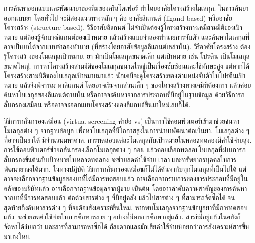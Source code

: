 {\begin{shaded}
การค้นหาออกแบบและพัฒนายาของทีมของคริสโตเฟอร์
ทำโดยอาศัยโครงสร้างโมเลกุล.
ในการค้นยาออกแบบยา
โดยทั่วไป จะมีสองแนวทางหลัก ๆ คือ อาศัยลิแกนต์ (ligand-based) หรืออาศัยโครงสร้าง (structure-based).
วิธีอาศัยลิแกนต์
ไม่จำเป็นต้องรู้โครงสร้างทางเคมีสามมิติของเป้าหมาย
แต่ต้องรู้จักบางลิแกนต์ของเป้าหมาย %
แล้วสร้างแบบจำลองทำนายการจับตัว
และค้นหาโมเลกุลที่อาจเป็นยาได้จากแบบจำลองทำนาย (ที่สร้างโดยอาศัยข้อมูลลิแกนต์เหล่านั้น). %
วิธีอาศัยโครงสร้าง
ต้องรู้โครงสร้างของโมเลกุลเป้าหมาย.
ยา มักเป็นโมเลกุลขนาดเล็ก
แต่เป้าหมาย เช่น โปรตีน เป็นโมเลกุลขนาดใหญ่.
การหาโครงสร้างสามมิติของโมเลกุลขนาดใหญ่เป็นเรื่องซับซ้อนและใช้ทักษะสูง
แต่หากได้โครงสร้างสามมิติของโมเลกุลเป้าหมายมาแล้ว
นักเคมีจะดูโครงสร้างของตำแหน่งจับตัวในโปรตีนเป้าหมาย
แล้วจึงพิจารณาหาลิแกนต์ 
โดยอาจเริ่มจากส่วนเล็ก ๆ ของโครงสร้างทางเคมีที่ต้องการ แล้วค่อยค้นหาโมเลกุลของลิแกนต์ตามนั้น
หรืออาจจะค้นหาจากสารประกอบที่มีอยู่ในฐานข้อมูล ด้วยวิธีการกลั่นกรองเสมือน
หรืออาจจะออกแบบโครงสร้างของลิแกนต์ขึ้นมาใหม่เลยก็ได้.

วิธีการกลั่นกรองเสมือน (virtual screening\cite{KarRoy2013} คำย่อ vs)
เป็นการใช้คอมพิวเตอร์เข้ามาช่วยค้นหาโมเลกุลต่าง ๆ จากฐานข้อมูล
เพื่อหาโมเลกุลที่มีโอกาสสูงในการนำมาพัฒนาต่อเป็นยา.
โมเลกุลต่าง ๆ ที่อาจเป็นยาได้ มีจำนวนมหาศาล.
การทดสอบแต่ละโมเลกุลกับเป้าหมายในหลอดทดลองมีค่าใช้จ่ายสูง.
การใช้คอมพิวเตอร์ช่วยกลั่นกรองเลือกโมเลกุลต่าง ๆ ก่อน
แล้วค่อยเลือกทดสอบโมเลกุลที่ผ่านการกลั่นกรองขั้นต้นกับเป้าหมายในหลอดทดลอง
จะช่วยลดค่าใช้จ่าย เวลา และทรัพยากรบุคคลในการพัฒนายาลงได้มาก.
%
ในทางปฏิบัติ วิธีการกลั่นกรองเสมือนก็ไม่ได้ค้นหากับทุกโมเลกุลที่เป็นไปได้
แต่อาจจะเลือกจากฐานข้อมูลของยาที่ได้มีการทดสอบแล้ว
อาจเลือกจากรายการของสารประกอบที่มีอยู่ในคลังของบริษัทแล้ว 
อาจเลือกจากฐานข้อมูลจากผู้ขาย เป็นต้น 
โดยอาจลำดับความสำคัญของการค้นหา จากยาที่มีการทดสอบแล้ว ต่อด้วยสารต่าง ๆ ที่มีอยู่คลัง แล้วไปสารต่าง ๆ ที่สามารถจัดซื้อได้ จนสุดท้ายถึงค้นหาสารต่าง ๆ ที่จะต้องสังเคราะห์ขึ้นใหม่.
หากพบโมเลกุลจากฐานข้อมูลยาที่มีการทดสอบแล้ว จะช่วยลดค่าใช้จ่ายในการศึกษาหลาย ๆ อย่างที่มีผลการศึกษาอยู่แล้ว.
สารที่มีอยู่แล้วในคลังก็จัดหาได้ง่ายกว่า
และสารที่สามารถหาซื้อได้ ก็สะดวกและมักเสียค่าใช้จ่ายน้อยกว่าการสังเคราะห์สารขึ้นมาเองใหม่.


\end{shaded}}
